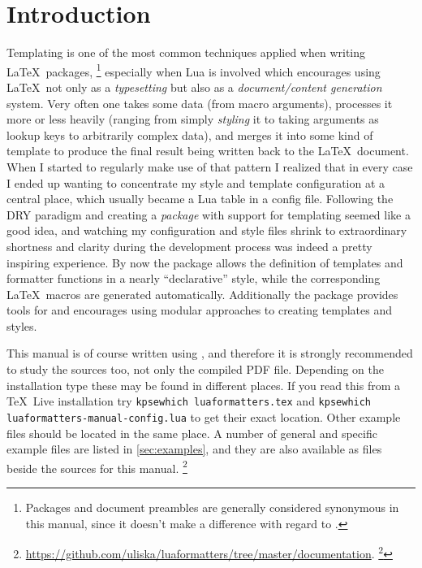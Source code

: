 \documentclass[12pt]{scrartcl}
\begin{document}
\newpage

\tableofcontents

\section{Introduction}

\let\oldsection\section
\renewcommand\section{\newpage\oldsection}

Templating is one of the most common techniques applied when writing \LaTeX\
packages,%
\footnote{Packages and document preambles are generally considered synonymous in this manual, since it doesn't make a difference with regard to \luaformatters.} %
especially when Lua is involved which encourages using \LaTeX\ not
only as a \emph{typesetting} but also as a \emph{document/content generation}
system.  Very often one takes some data (from macro arguments), processes it
more or less heavily (ranging from simply \emph{styling} it to taking arguments
as lookup keys to arbitrarily complex data), and merges it into some kind of
template to produce the final result being written back to the \LaTeX\ document.
When I started to regularly make use of that pattern I realized that in every
case I ended up wanting to concentrate my style and template configuration at a
central place, which usually became a Lua table in a config file.  Following the
DRY paradigm and creating a \emph{package} with support for templating seemed
like a good idea, and watching my configuration and style files shrink to
extraordinary shortness and clarity during the development process was indeed a
pretty inspiring experience.  By now the package allows the definition of
templates and formatter functions in a nearly “declarative” style, while the
corresponding \LaTeX\ macros are generated automatically. Additionally the
package provides tools for and encourages using modular approaches to creating
templates and styles.

This manual is of course written using \luaformatters, and therefore it is
strongly recommended to study the sources too, not only the compiled PDF file.
Depending on the installation type these may be found in different places.  If
you read this from a \TeX\ Live installation try \texttt{kpsewhich
luaformatters.tex} and \texttt{kpsewhich luaformatters-manual-config.lua} to get
their exact location.  Other example files should be located in the same place.
A number of general and specific example files are listed in
\vref{sec:examples}, and they are also available as files beside the sources for
this manual.%
\footnote{\url{https://github.com/uliska/luaformatters/tree/master/documentation}.%
\footnote{\textbf{TODO:} Clarify where they end up in TeX Live.}}
\end{document}
